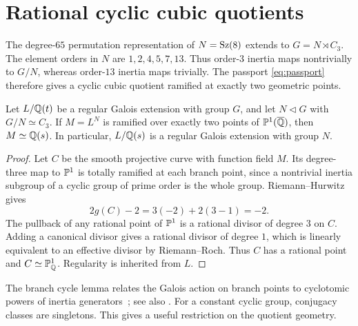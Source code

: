\section{Rational cyclic cubic quotients}\label{sec:strategy}

The degree-$65$ permutation representation of $N=\operatorname{Sz}(8)$ extends to
$G=N\rtimes C_3$. The element orders in $N$ are $1,2,4,5,7,13$.
Thus order-$3$ inertia maps nontrivially to $G/N$, whereas order-$13$
inertia maps trivially. The passport \eqref{eq:passport} therefore gives
a cyclic cubic quotient ramified at exactly two geometric points.

\begin{lemma}\label{lem:rationalquotient}
Let $L/\mathbb{Q}(t)$ be a regular Galois extension with group $G$, and let
$N\triangleleft G$ with $G/N\simeq C_3$. If $M=L^N$ is ramified over exactly
two points of $\mathbb{P}^1(\overline{\mathbb{Q}})$, then $M\simeq\mathbb{Q}(s)$. In particular,
$L/\mathbb{Q}(s)$ is a regular Galois extension with group $N$.
\end{lemma}
\begin{proof}
Let $C$ be the smooth projective curve with function field $M$. Its
degree-three map to $\mathbb{P}^1$ is totally ramified at each branch point,
since a nontrivial inertia subgroup of a cyclic group of prime order is
the whole group. Riemann--Hurwitz gives
\[
2g(C)-2=3(-2)+2(3-1)=-2.
\]
The pullback of any rational point of $\mathbb{P}^1$ is a rational divisor of
degree $3$ on $C$. Adding a canonical divisor gives a rational divisor
of degree $1$, which is linearly equivalent to an effective divisor by
Riemann--Roch. Thus $C$ has a rational point and $C\simeq\mathbb{P}^1_{\mathbb{Q}}$.
Regularity is inherited from $L$.
\end{proof}

The branch cycle lemma relates the Galois action on branch points to
cyclotomic powers of inertia generators~\cite{Fried1977}; see also
\cite[p.~34]{Volklein1996}. For a constant cyclic group, conjugacy classes
are singletons. This gives a useful restriction on the quotient geometry.

